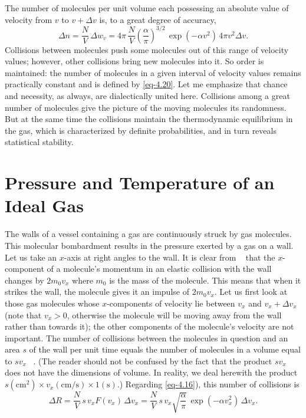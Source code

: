 The number of molecules per unit volume each possessing an absolute value of velocity from $v$ to $v + \Delta v$ is, to a great degree of accuracy,
\begin{equation}%
\Delta n = \frac{N}{V} \, \Delta w_{v}  =  4 \pi \, \frac{N}{V}  \left(\frac{\alpha}{\pi} \right) ^{3/2} \, \exp (- \alpha v^{2}) \, 4 \pi v^{2} \Delta v.
\label{eq-4.20}
\end{equation}
Collisions between molecules push some molecules out of this range of velocity values; however, other collisions bring new molecules into it. So order is maintained: the number of molecules in a given interval of velocity values remains practically constant and is defined by \eqref{eq-4.20}. Let me emphasize that chance and necessity, as always, are dialectically united here. Collisions among a great number of molecules give the picture of the moving molecules its randomness. But at the same time the collisions maintain the thermodynamic equilibrium in the gas, which is characterized by definite probabilities, and in turn reveals statistical stability.

\section{Pressure and Temperature of an Ideal Gas}

 The walls of a vessel containing a gas are continuously struck by gas molecules. This molecular bombardment results in the pressure exerted by a gas on a wall. Let us take an $x$-axis at right angles to the wall. It is clear from ~ that the $x$-component of a molecule's momentum in an elastic collision with the wall changes by $2m_{0}v_{x}$ where $m_{0}$ is the mass of the molecule. This means that when it strikes the wall, the molecule gives it an impulse of $2m_{0}v_{x}$. Let us first look at those gas molecules whose $x$-components of velocity lie between $v_{x}$ and $v_{x} + \Delta v_{x}$ (note that $v_{x} > 0$, otherwise the molecule will be moving away from the wall rather than towards it); the other components of the molecule's velocity are not important. The number of collisions between the molecules in question and an area $s$ of the wall per unit time equals the number of molecules in a volume equal to $s v_{x}$ ~. (The reader should not be confused by the fact that the product $s v_{x}$ does not have the dimensions of volume. In reality, we deal herewith the product $s(\si{\centi\meter\squared}) \times v_{x} (\si{\centi\meter\per\second}) \times 1 (\si{\second})$.) Regarding \eqref{eq-4.16}), this number of collisions is
\begin{equation*}%
\Delta R = \frac{N}{V} \, s\, v_{x} F(v_{x}) \, \Delta v_{x} =  \frac{N}{V} \, s\, v_{x} \sqrt{\frac{\alpha}{ \pi}} \, \exp (- \alpha v_{x}^{2}) \, \Delta v_{x}.
\end{equation*}

